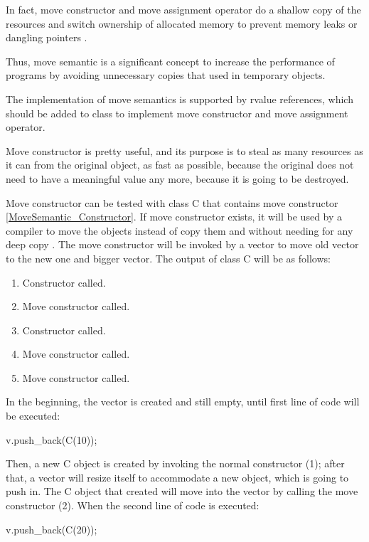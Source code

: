 \documentclass[11pt]{report}
\begin{document}
In fact, move constructor and move assignment operator do a shallow copy of the resources and switch ownership of allocated memory to prevent memory leaks or dangling pointers \cite{Gregorie:professionalcpp}.
\newline

Thus, move semantic is a significant concept to increase the performance of programs by avoiding unnecessary copies that used in temporary objects.
\newline

The implementation of move semantics is supported by rvalue references, which should be added to class to implement move constructor and move assignment operator.
\newline

Move constructor is pretty useful, and its purpose is to steal as many resources as it can from the original object, as fast as possible, because the original does not need to have a meaningful value any more, because it is going to be destroyed. 
\newline

Move constructor can be tested with class C that contains move constructor \ref{MoveSemantic_Constructor}. If move constructor exists, it will be used by a compiler to move the objects instead of copy them and without needing for any deep copy \cite{MSDN:2012:CppModern}. The move constructor will be invoked by a vector to move old vector to the new one and bigger vector. The output of class C will be as follows:

\begin{enumerate}
\item Constructor called.
\item Move constructor called.
\item Constructor called.
\item Move constructor called.
\item Move constructor called.
\end{enumerate}

In the beginning, the vector is created and still empty, until first line of code will be executed:
\begin{center}
v.push\_back(C(10));
\end{center} 

Then, a new C object is created by invoking the normal constructor (1); after that, a vector will resize itself to accommodate a new object, which is going to push in. The C object that created will move into the vector by calling the move constructor (2). When the second line of code is executed:
\begin{center}
v.push\_back(C(20));
\end{center}
\end{document}
